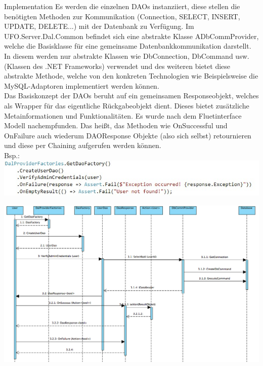 \begin{section}{Implementation}
Es werden die einzelnen DAOs instanziiert, diese stellen die benötigten Methoden zur Kommunikation (Connection, SELECT, INSERT, UPDATE, DELETE...) mit der Datenbank zu Verfügung.
Im UFO.Server.Dal.Common befindet sich eine abstrakte Klasse ADbCommProvider, welche die Basisklasse für eine gemeinsame Datenbankkommunikation darstellt. In diesem werden nur abstrakte Klassen wie DbConnection, DbCommand usw. (Klassen des .NET Frameworks) verwendet und des weiteren bietet diese abstrakte Methode, welche von den konkreten Technologien wie Beispielsweise die MySQL-Adaptoren implementiert werden können. \\

Das Basiskonzept der DAOs beruht auf ein gemeinsamen Responseobjekt, welches als Wrapper für das eigentliche Rückgabeobjekt dient. Dieses bietet zusätzliche Metainformationen und Funktionalitäten.
Es wurde nach dem Fluetinterface Modell nachempfunden. Das heißt, das Methoden wie OnSuccessful und OnFailure auch wiederum DAOResponse Objekte (also sich selbst) retournieren und diese per Chaining aufgerufen werden können. \\
Bsp.: \\

\includegraphics[angle=0, scale=0.75]{./img/snippet.jpg}
\FloatBarrier

\nPar

\includegraphics[angle=0, scale=0.45]{./img/SequenceDiagram.jpg}
\FloatBarrier

\nPar


\end{section}
